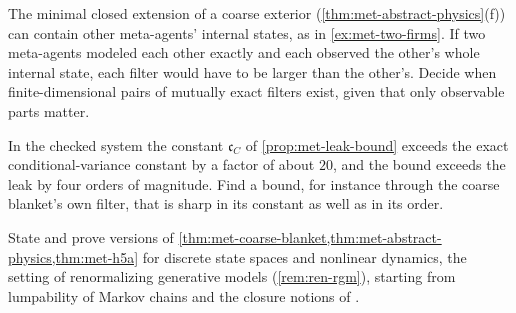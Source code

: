 \begin{openproblem}\label{open:met-mutual}
The minimal closed extension of a coarse exterior (\cref{thm:met-abstract-physics}(f)) can contain other meta-agents' internal states, as in \cref{ex:met-two-firms}. If two meta-agents modeled each other exactly and each observed the other's whole internal state, each filter would have to be larger than the other's. Decide when finite-dimensional pairs of mutually exact filters exist, given that only observable parts matter.
\end{openproblem}

\begin{openproblem}\label{open:met-leak-constant}
In the checked system the constant $\mathfrak c_C$ of \cref{prop:met-leak-bound} exceeds the exact conditional-variance constant by a factor of about $20$, and the bound exceeds the leak by four orders of magnitude. Find a bound, for instance through the coarse blanket's own filter, that is sharp in its constant as well as in its order.
\end{openproblem}

\begin{openproblem}\label{open:met-nonlinear}
State and prove versions of \cref{thm:met-coarse-blanket,thm:met-abstract-physics,thm:met-h5a} for discrete state spaces and nonlinear dynamics, the setting of renormalizing generative models (\cref{rem:ren-rgm}), starting from lumpability of Markov chains and the closure notions of \citet{rosas2024software}.
\end{openproblem}
